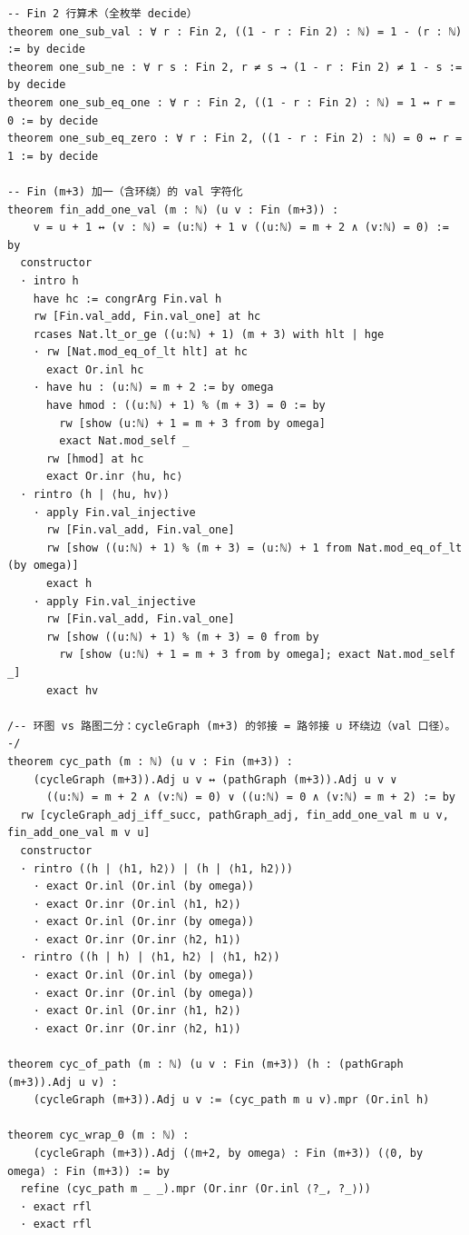 \documentclass[11pt]{article}
\begin{document}
\begin{lstlisting}
-- Fin 2 行算术（全枚举 decide）
theorem one_sub_val : ∀ r : Fin 2, ((1 - r : Fin 2) : ℕ) = 1 - (r : ℕ) := by decide
theorem one_sub_ne : ∀ r s : Fin 2, r ≠ s → (1 - r : Fin 2) ≠ 1 - s := by decide
theorem one_sub_eq_one : ∀ r : Fin 2, ((1 - r : Fin 2) : ℕ) = 1 ↔ r = 0 := by decide
theorem one_sub_eq_zero : ∀ r : Fin 2, ((1 - r : Fin 2) : ℕ) = 0 ↔ r = 1 := by decide

-- Fin (m+3) 加一（含环绕）的 val 字符化
theorem fin_add_one_val (m : ℕ) (u v : Fin (m+3)) :
    v = u + 1 ↔ (v : ℕ) = (u:ℕ) + 1 ∨ ((u:ℕ) = m + 2 ∧ (v:ℕ) = 0) := by
  constructor
  · intro h
    have hc := congrArg Fin.val h
    rw [Fin.val_add, Fin.val_one] at hc
    rcases Nat.lt_or_ge ((u:ℕ) + 1) (m + 3) with hlt | hge
    · rw [Nat.mod_eq_of_lt hlt] at hc
      exact Or.inl hc
    · have hu : (u:ℕ) = m + 2 := by omega
      have hmod : ((u:ℕ) + 1) % (m + 3) = 0 := by
        rw [show (u:ℕ) + 1 = m + 3 from by omega]
        exact Nat.mod_self _
      rw [hmod] at hc
      exact Or.inr ⟨hu, hc⟩
  · rintro (h | ⟨hu, hv⟩)
    · apply Fin.val_injective
      rw [Fin.val_add, Fin.val_one]
      rw [show ((u:ℕ) + 1) % (m + 3) = (u:ℕ) + 1 from Nat.mod_eq_of_lt (by omega)]
      exact h
    · apply Fin.val_injective
      rw [Fin.val_add, Fin.val_one]
      rw [show ((u:ℕ) + 1) % (m + 3) = 0 from by
        rw [show (u:ℕ) + 1 = m + 3 from by omega]; exact Nat.mod_self _]
      exact hv

/-- 环图 vs 路图二分：cycleGraph (m+3) 的邻接 = 路邻接 ∪ 环绕边（val 口径）。 -/
theorem cyc_path (m : ℕ) (u v : Fin (m+3)) :
    (cycleGraph (m+3)).Adj u v ↔ (pathGraph (m+3)).Adj u v ∨
      ((u:ℕ) = m + 2 ∧ (v:ℕ) = 0) ∨ ((u:ℕ) = 0 ∧ (v:ℕ) = m + 2) := by
  rw [cycleGraph_adj_iff_succ, pathGraph_adj, fin_add_one_val m u v, fin_add_one_val m v u]
  constructor
  · rintro ((h | ⟨h1, h2⟩) | (h | ⟨h1, h2⟩))
    · exact Or.inl (Or.inl (by omega))
    · exact Or.inr (Or.inl ⟨h1, h2⟩)
    · exact Or.inl (Or.inr (by omega))
    · exact Or.inr (Or.inr ⟨h2, h1⟩)
  · rintro ((h | h) | ⟨h1, h2⟩ | ⟨h1, h2⟩)
    · exact Or.inl (Or.inl (by omega))
    · exact Or.inr (Or.inl (by omega))
    · exact Or.inl (Or.inr ⟨h1, h2⟩)
    · exact Or.inr (Or.inr ⟨h2, h1⟩)

theorem cyc_of_path (m : ℕ) (u v : Fin (m+3)) (h : (pathGraph (m+3)).Adj u v) :
    (cycleGraph (m+3)).Adj u v := (cyc_path m u v).mpr (Or.inl h)

theorem cyc_wrap_0 (m : ℕ) :
    (cycleGraph (m+3)).Adj (⟨m+2, by omega⟩ : Fin (m+3)) (⟨0, by omega⟩ : Fin (m+3)) := by
  refine (cyc_path m _ _).mpr (Or.inr (Or.inl ⟨?_, ?_⟩))
  · exact rfl
  · exact rfl


\end{lstlisting}
\end{document}
